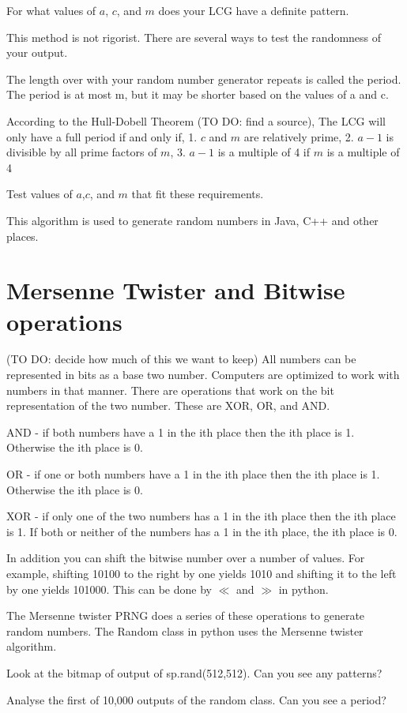 \begin{problem}
For what values of $a$, $c$, and $m$ does your LCG have a definite pattern.
\end{problem}

This method is not rigorist. There are several ways to test the randomness of your output. 

The length over with your random number generator repeats is called the period.
The period is at most m, but it may be shorter based on the values of a and c.
 
According to the Hull-Dobell Theorem (TO DO: find a source), The LCG will only have a full period if and only if, 
1. $c$ and $m$ are relatively prime,
2. $a-1$ is divisible by all prime factors of $m$,
3. $a-1$ is a multiple of 4 if $m$ is a multiple of 4

\begin{problem}
Test values of $a$,$c$, and $m$ that fit these requirements. 
\end{problem}

This algorithm is used to generate random numbers in Java, C++ and other places.

\section*{Mersenne Twister and Bitwise operations}

(TO DO: decide how much of  this we want to keep) All numbers can be represented in bits as a base two number.
Computers are optimized to work with numbers in that manner.
There are operations that work on the bit representation of the two number.
These are XOR, OR, and AND. 

AND - if both numbers have a 1 in the ith place then the ith place is 1.
Otherwise the ith place is 0.

OR - if one or both numbers have a 1 in the ith place then the ith place is 1.
Otherwise the ith place is 0.

XOR - if only one of the two numbers has a 1 in the ith place then the ith place is 1.
If both or neither of the numbers has a 1 in the ith place, the ith place is 0.

In addition you can shift the bitwise number over a number of values.
For example, shifting 10100 to the right by one yields 1010 and shifting it to the left by one yields 101000.
This can be done by $\ll$ and $\gg$ in python. 

The Mersenne twister PRNG does a series of these operations to generate random numbers.
The Random class in python uses the Mersenne twister algorithm. 

\begin{problem}
Look at the bitmap of output of sp.rand(512,512).
Can you see any patterns?
\end{problem}

\begin{problem}
Analyse the first of 10,000 outputs of the random class.
Can you see a period?
\end{problem}
